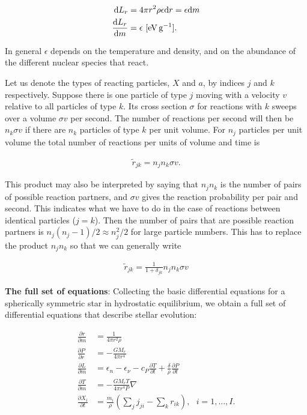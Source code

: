 \documentclass[a4paper,10pt]{article}
\begin{document}
\begin{align*}
    {\rm d}L_r &= 4\pi r^2\rho\epsilon{\rm d}r = \epsilon {\rm d}m \\
    \frac{{\rm d}L_r}{{\rm d}m} &= \epsilon ~ [{\rm eV\,g^{-1}}].
\end{align*}

{\noindent}In general $\epsilon$ depends on the temperature and density, and on the abundance of the different nuclear species that react.

{\noindent}Let us denote the types of reacting particles, $X$ and $a$, by indices $j$ and $k$ respectively. Suppose there is one particle of type $j$ moving with a velocity $v$ relative to all particles of type $k$. Its cross section $\sigma$ for reactions with $k$ sweeps over a volume $\sigma v$ per second. The number of reactions per second will then be $n_k \sigma v$ if there are $n_k$ particles of type $k$ per unit volume. For $n_j$ particles per unit volume the total number of reactions per units of volume and time is

\begin{align*}
    \tilde{r}_{jk} = n_jn_k\sigma v.
\end{align*}

{\noindent}This product may also be interpreted by saying that $n_jn_k$ is the number of pairs of possible reaction partners, and $\sigma v$ gives the reaction probability per pair and second. This indicates what we have to do in the case of reactions between identical particles ($j=k$). Then the number of pairs that are possible reaction partners is $n_j(n_j-1)/2\approx n_j^2/2$ for large particle numbers. This has to replace the product $n_jn_k$ so that we can generally write

\begin{align*}
    \tilde{r}_{jk} = \frac{1}{1+\delta_{jk}}n_jn_k\sigma v
\end{align*}

{\noindent}\textbf{The full set of equations}: Collecting the basic differential equations for a spherically symmetric star in hydrostatic equilibrium, we obtain a full set of differential equations that describe stellar evolution:

\begin{equation*}
\boxed{
    \begin{aligned}
        \frac{\partial r}{\partial m} &= \frac{1}{4\pi r^2\rho} \\
        \frac{\partial P}{\partial r} &= -\frac{GM_r}{4\pi r^4} \\
        \frac{\partial L}{\partial m} &= \epsilon_n-\epsilon_\nu-c_P \frac{\partial T}{\partial t} + \frac{\delta}{\rho}\frac{\partial P}{\partial t} \\
        \frac{\partial T}{\partial m} &= -\frac{GM_rT}{4\pi r^4P}\nabla \\
        \frac{\partial X_i}{\partial t} &= \frac{m_i}{\rho} \left(\sum_jj_{ji} - \sum_kr_{ik}\right), ~~~ i=1,...,I.
    \end{aligned}
}
\end{equation*}
\end{document}
